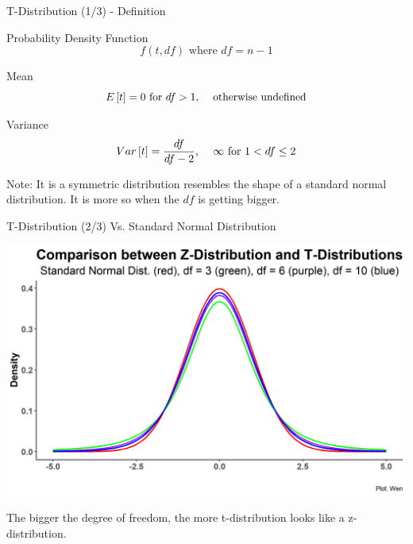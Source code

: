 \documentclass{beamer}
\begin{document}
\begin{frame}{T-Distribution (1/3) - Definition}

Probability Density Function 
$$f(t, df) \text{ where } df = n-1$$

Mean 
$$E\left[ t \right]= 0 \text{  for  } df > 1 \text{, \quad otherwise undefined}$$

Variance 
$$ Var\left[ t \right] = \frac{df}{df - 2} \text{,  \quad} \infty \text{  for  } 1<df\leq 2$$

Note: It is a symmetric distribution resembles the shape of a standard normal distribution. It is more so when the $df$ is getting bigger.

\end{frame}



\begin{frame}{T-Distribution (2/3) Vs. Standard Normal Distribution}


\begin{center}
\includegraphics[scale=0.52]{images/normalandTdf-1.png}

\end{center}

The bigger the degree of freedom, the more t-distribution looks like a z-distribution. 

\end{frame}
\end{document}
